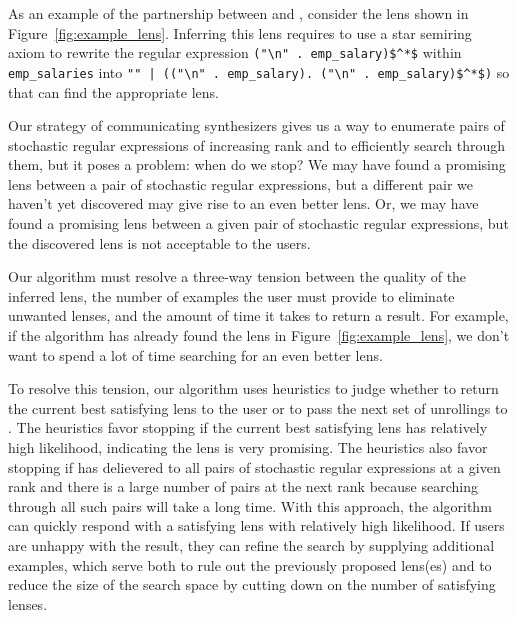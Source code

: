 \documentclass[acmsmall,screen,anonymous]{acmart}
\begin{document}
As an example of the partnership between \Expand and \GreedySynth,
consider the lens shown in Figure~\ref{fig:example_lens}. 
Inferring this lens requires \Expand to use a star semiring axiom to
rewrite the regular expression \lstinline{("\n" . emp_salary)$^*$} within
\lstinline{emp_salaries} into 
\lstinline{"" | (("\n" . emp_salary). ("\n" . emp_salary)$^*$)} 
so that \GreedySynth can find the appropriate lens.  

Our strategy of communicating synthesizers gives us a way to
enumerate pairs of stochastic regular expressions of increasing
rank and to efficiently search through them, but it poses a
problem: when do we stop? We may have found a promising lens
between a pair of stochastic regular expressions, but a different 
pair we haven't yet discovered may give rise to an even better lens. 
Or, we may have found a promising lens between a given pair of
stochastic regular expressions, but the discovered lens is not 
acceptable to the users. 

Our algorithm must resolve a three-way tension between the quality of
the inferred lens, the number of examples the user must provide to
eliminate unwanted lenses, and the amount of time it takes to return a
result.  For example, if the algorithm has already found the lens in
Figure~\ref{fig:example_lens}, we don't want to spend a lot of time
searching for an even better lens.

To resolve this tension, our algorithm uses heuristics to judge whether to
return the current best satisfying lens to the user or to pass the
next set of unrollings to \GreedySynth.
The heuristics favor stopping if the current best satisfying
lens has relatively high likelihood, indicating the lens is very promising.
The heuristics also favor stopping if \Expand
has delievered to \GreedySynth all pairs of stochastic regular
expressions at a given rank and there is a large number of pairs at the next
rank because searching through all such pairs will take a long time.
With this approach, the algorithm can quickly respond with a satisfying
lens with relatively high likelihood.  If users are unhappy with the result, they can refine the
search by supplying additional examples, which serve both to rule out
the previously proposed lens(es) and to reduce the size of the search
space by cutting down on the number of satisfying lenses.


\end{document}

